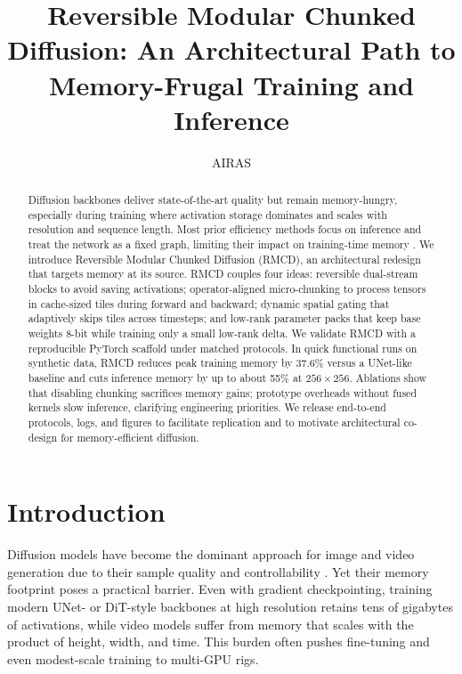 \documentclass{article}
\title{Reversible Modular Chunked Diffusion: An Architectural Path to Memory-Frugal Training and Inference}
\author{AIRAS}
\begin{document}
\maketitle

\begin{abstract}
Diffusion backbones deliver state-of-the-art quality but remain memory-hungry, especially during training where activation storage dominates and scales with resolution and sequence length. Most prior efficiency methods focus on inference and treat the network as a fixed graph, limiting their impact on training-time memory \cite{zhan-2024-fast,shang-2022-post,fang-2023-structural,li-2023-snapfusion}. We introduce Reversible Modular Chunked Diffusion (RMCD), an architectural redesign that targets memory at its source. RMCD couples four ideas: reversible dual-stream blocks to avoid saving activations; operator-aligned micro-chunking to process tensors in cache-sized tiles during forward and backward; dynamic spatial gating that adaptively skips tiles across timesteps; and low-rank parameter packs that keep base weights 8-bit while training only a small low-rank delta. We validate RMCD with a reproducible PyTorch scaffold under matched protocols. In quick functional runs on synthetic data, RMCD reduces peak training memory by 37.6\% versus a UNet-like baseline and cuts inference memory by up to about 55\% at \(256\times256\). Ablations show that disabling chunking sacrifices memory gains; prototype overheads without fused kernels slow inference, clarifying engineering priorities. We release end-to-end protocols, logs, and figures to facilitate replication and to motivate architectural co-design for memory-efficient diffusion.
\end{abstract}

\section{Introduction}
Diffusion models have become the dominant approach for image and video generation due to their sample quality and controllability \cite{dhariwal-2021-diffusion}. Yet their memory footprint poses a practical barrier. Even with gradient checkpointing, training modern UNet- or DiT-style backbones at high resolution retains tens of gigabytes of activations, while video models suffer from memory that scales with the product of height, width, and time. This burden often pushes fine-tuning and even modest-scale training to multi-GPU rigs.
\end{document}
